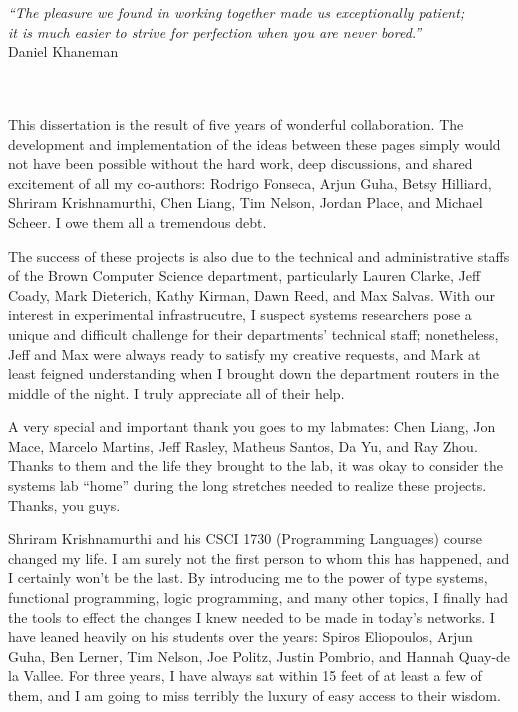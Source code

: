 

{\raggedleft{}
\emph{``The pleasure we found in working together made us exceptionally patient; \\
it is much easier to strive for perfection when you are never bored.''}\\
\hfill Daniel Khaneman
}

\ \\
\ \\

This dissertation is the result of five years of wonderful collaboration.
The development and implementation of the ideas between these pages simply
would not have been possible without the hard work, deep discussions, and
shared excitement of all my co-authors: Rodrigo Fonseca, Arjun Guha, Betsy Hilliard,
Shriram Krishnamurthi, Chen Liang, Tim Nelson, Jordan Place, and Michael
Scheer. I owe them all a tremendous debt.

The success of these projects is also due to the technical and administrative
staffs of the Brown Computer Science department, particularly Lauren
Clarke, Jeff Coady, Mark Dieterich, Kathy Kirman, Dawn Reed, and Max Salvas.
With our interest in experimental infrastrucutre, I suspect systems researchers
pose a unique and difficult challenge for their departments' technical staff;
nonetheless, Jeff and Max were always ready to satisfy my creative requests,
and Mark at least feigned understanding when I brought down the department
routers in the middle of the night. I truly appreciate all of their help.

A very special and important thank you goes to my labmates:
Chen Liang, Jon Mace, Marcelo Martins, Jeff Rasley, Matheus Santos, Da Yu,
and Ray Zhou. Thanks to them and the life they brought to the lab, it was
okay to consider the systems lab ``home'' during the long stretches needed to
realize these projects. Thanks, you guys.

Shriram Krishnamurthi and his CSCI 1730 (Programming Languages) course
changed my life. I am surely not the first person to whom this has happened,
and I certainly won't be the last. By introducing me to the power of
type systems, functional programming, logic programming, and many other
topics, I finally had the tools to effect the changes I knew needed to
be made in today's networks. I have leaned heavily on his students over
the years: Spiros Eliopoulos, Arjun Guha, Ben Lerner, Tim Nelson, Joe Politz,
Justin Pombrio, and Hannah Quay-de la Vallee. For three years, I have always
sat within 15 feet of at least a few of them, and I am going to miss
terribly the luxury of easy access to their wisdom.

